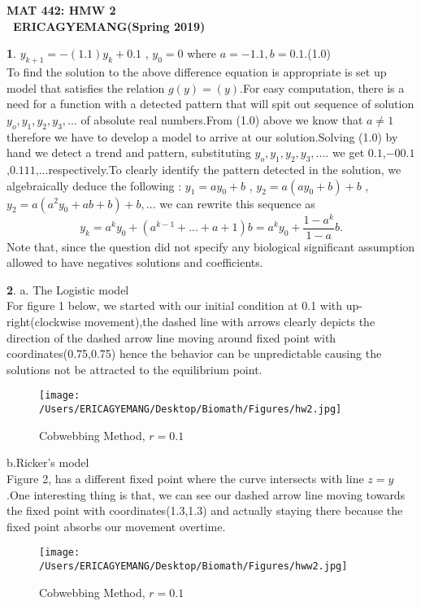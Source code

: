 \documentclass[12pt]{article}
\begin{document}
\begin{center}
\textbf{ MAT 442: HMW 2}\\
\textbf{\ ERICAGYEMANG(Spring 2019)}\\
\end{center}

\textbf{1}. $y_{k+1} = -(1.1)y_k+0.1$ , $y_0=0$ where $a=-1.1,b=0.1$.\hspace{2cm}(1.0)\\
To find the solution to the above difference equation is appropriate is set up model that satisfies the relation $g(y)=(y)$.For easy computation, there is a need for a function with a detected pattern that will spit out sequence of solution $y_o,y_1,y_2,y_3,...$ of absolute real numbers.From (1.0) above we know that $a\ne1$ therefore we have to develop a model to arrive at our solution.Solving (1.0) by hand we detect a trend and pattern, substituting $y_o,y_1,y_2,y_3,....$ we get $0.1$,$-00.1$,$0.111$,...respectively.To clearly identify the pattern detected in the solution, we algebraically deduce the following : $y_1=ay_0+b$ , $y_2=a(ay_0+b)+b$ , $y_2=a(a^2y_0+ab+b)+b,...$ we can rewrite this sequence as
 \[y_k=a^ky_0+(a^{k-1}+...+a+1)b=a^ky_0+\frac{1-a^k}{1-a}b.\] Note that, since the question did not specify any biological significant assumption allowed to have negatives solutions and coefficients.




 \cleardoublepage        

 \textbf{2}. a. The Logistic model\\
 For figure 1 below, we started with our initial condition at 0.1 with up-right(clockwise movement),the dashed line with arrows clearly depicts the direction of the dashed arrow line moving around fixed point with coordinates(0.75,0.75) hence the behavior can be unpredictable causing the solutions not be attracted to the equilibrium point. 
\begin{figure} [ht!]
 \centering
 \texttt{[image: /Users/ERICAGYEMANG/Desktop/Biomath/Figures/hw2.jpg]} 
\caption[Figure 2.4: r>1]{Cobwebbing Method, $r=0.1$}
 \label{fig::model}
\end{figure}

 b.Ricker's model\\
 Figure 2, has a different fixed point where the curve intersects with line $z=y$.One interesting thing is that, we can see our dashed arrow line moving towards the fixed point with coordinates(1.3,1.3) and actually staying there because the fixed point absorbs our movement overtime.
\begin{figure} [ht!]
 \centering
 \texttt{[image: /Users/ERICAGYEMANG/Desktop/Biomath/Figures/hww2.jpg]} 
\caption[Figure 2.4: r>1]{Cobwebbing Method, $r=0.1$}
 \label{fig::model}
\end{figure}
 
\end{document}
